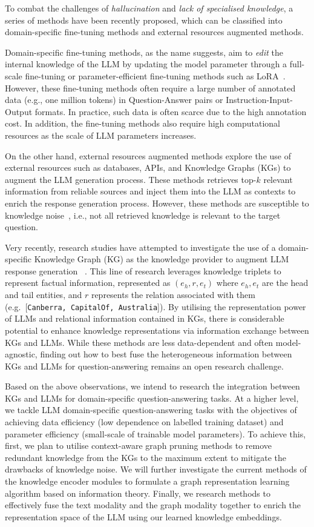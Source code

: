 To combat the challenges of \emph{hallucination} and \emph{lack of specialised knowledge}, a series of methods have been recently proposed, which can be classified into domain-specific fine-tuning methods and external resources augmented methods.

Domain-specific fine-tuning methods, as the name suggests, aim to \emph{edit} the internal knowledge of the LLM by updating the model parameter through a full-scale fine-tuning or parameter-efficient fine-tuning methods such as LoRA~\parencite{lora}.
However, these fine-tuning methods often require a large number of annotated data (e.g., one million tokens) in Question-Answer pairs or Instruction-Input-Output formats. In practice, such data is often scarce due to the high annotation cost. 
In addition, the fine-tuning methods also require high computational resources as the scale of LLM parameters increases.

On the other hand, external resources augmented methods explore the use of external resources such as databases, APIs, and Knowledge Graphs (KGs) to augment the LLM generation process. 
These methods retrieves top-$k$ relevant information from reliable sources and inject them into the LLM as contexts to enrich the response generation process.
However, these methods are susceptible to knowledge noise~\parencite{kbert}, i.e., not all retrieved knowledge is relevant to the target question.

Very recently, research studies have attempted to investigate the use of a domain-specific Knowledge Graph (KG) as the knowledge
provider to augment LLM response generation ~\parencite{gnp, graph-prompter, kalm-prompting}.
This line of research leverages knowledge triplets to represent factual information, represented as $(e_h, r, e_t)$ where $e_h, e_t$ are the head and tail entities, and $r$ represents the relation associated with them (e.g.\ [\texttt{Canberra, CapitalOf, Australia}]).
By utilising the representation power of LLMs and relational information contained in KGs, there is considerable potential to enhance knowledge representations via information exchange between KGs and LLMs.
While these methods are less data-dependent and often model-agnostic, finding out how to best fuse the heterogeneous information between KGs and LLMs for question-answering remains an open research challenge.

Based on the above observations, we intend to research the integration between KGs and LLMs for domain-specific question-answering tasks. 
At a higher level, we tackle LLM domain-specific question-answering tasks with the objectives of achieving data efficiency (low dependence on labelled training dataset) and parameter efficiency (small-scale of trainable model parameters).
To achieve this, first, we plan to utilise context-aware graph pruning methods to remove redundant knowledge from the KGs to the maximum extent to mitigate the drawbacks of knowledge noise. 
We will further investigate the current methods of the knowledge encoder modules to formulate a graph representation learning algorithm based on information theory. 
Finally, we research methods to effectively fuse the text modality and the graph modality together to enrich the representation space of the LLM using our learned knowledge embeddings.
